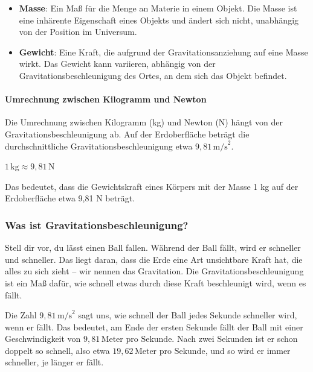 \documentclass{vorlage-design-main}
\begin{document}
\begin{itemize}

\item
  \textbf{Masse}: Ein Maß für die Menge an Materie in einem Objekt. Die
  Masse ist eine inhärente Eigenschaft eines Objekts und ändert sich
  nicht, unabhängig von der Position im Universum.
\item
  \textbf{Gewicht}: Eine Kraft, die aufgrund der Gravitationsanziehung
  auf eine Masse wirkt. Das Gewicht kann variieren, abhängig von der
  Gravitationsbeschleunigung des Ortes, an dem sich das Objekt befindet.
\end{itemize}

\hypertarget{umrechnung-zwischen-kilogramm-und-newton}{%
\paragraph{Umrechnung zwischen Kilogramm und
Newton}\label{umrechnung-zwischen-kilogramm-und-newton}}

Die Umrechnung zwischen Kilogramm (kg) und Newton (N) hängt von der
Gravitationsbeschleunigung ab. Auf der Erdoberfläche beträgt die
durchschnittliche Gravitationsbeschleunigung etwa
$9,81 \, \text{m/s}^2$.

$1 \, \text{kg} \approx 9,81 \, \text{N}$

Das bedeutet, dass die Gewichtskraft eines Körpers mit der Masse 1 kg
auf der Erdoberfläche etwa 9,81 N beträgt.

\hypertarget{was-ist-gravitationsbeschleunigung}{%
\subsubsection{Was ist
Gravitationsbeschleunigung?}\label{was-ist-gravitationsbeschleunigung}}

Stell dir vor, du lässt einen Ball fallen. Während der Ball fällt, wird
er schneller und schneller. Das liegt daran, dass die Erde eine Art
unsichtbare Kraft hat, die alles zu sich zieht -- wir nennen das
Gravitation. Die Gravitationsbeschleunigung ist ein Maß dafür, wie
schnell etwas durch diese Kraft beschleunigt wird, wenn es fällt.

Die Zahl $9,81 \, \text{m/s}^2$ sagt uns, wie schnell der Ball jedes
Sekunde schneller wird, wenn er fällt. Das bedeutet, am Ende der ersten
Sekunde fällt der Ball mit einer Geschwindigkeit von
$9,81 \, \text{Meter pro Sekunde}$. Nach zwei Sekunden ist er schon
doppelt so schnell, also etwa $19,62 \, \text{Meter pro Sekunde}$, und
so wird er immer schneller, je länger er fällt.
\end{document}
